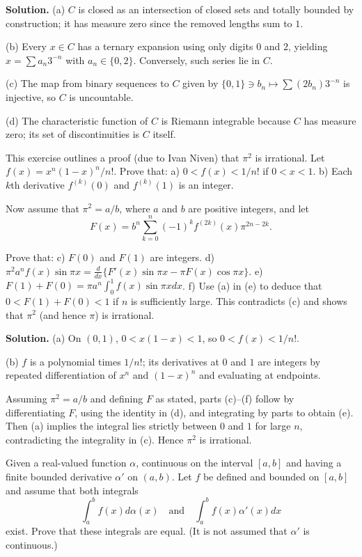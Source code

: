 \noindent\textbf{Solution.}
(a) $C$ is closed as an intersection of closed sets and totally bounded by construction; it has measure zero since the removed lengths sum to $1$.

(b) Every $x\in C$ has a ternary expansion using only digits $0$ and $2$, yielding $x=\sum a_n 3^{-n}$ with $a_n\in\{0,2\}$. Conversely, such series lie in $C$.

(c) The map from binary sequences to $C$ given by $\{0,1\}\ni b_n\mapsto \sum (2b_n)3^{-n}$ is injective, so $C$ is uncountable.

(d) The characteristic function of $C$ is Riemann integrable because $C$ has measure zero; its set of discontinuities is $C$ itself.
\medskip

\begin{problembox}[7.33: Irrationality of $\pi^2$]
This exercise outlines a proof (due to Ivan Niven) that $\pi^2$ is irrational. Let $f(x) = x^n(1 - x)^n/n!$. Prove that:
a) $0 < f(x) < 1/n!$ if $0 < x < 1$.
b) Each $k$th derivative $f^{(k)}(0)$ and $f^{(k)}(1)$ is an integer.

Now assume that $\pi^2 = a/b$, where $a$ and $b$ are positive integers, and let
\[F(x) = b^n \sum_{k=0}^{n} (-1)^k f^{(2k)}(x) \pi^{2n-2k}.\]

Prove that:
c) $F(0)$ and $F(1)$ are integers.
d) $\pi^2 a^n f(x) \sin \pi x = \frac{d}{dx} \{ F'(x) \sin \pi x - \pi F(x) \cos \pi x \}$.
e) $F(1) + F(0) = \pi a^n \int_{0}^{1} f(x) \sin \pi x dx$.
f) Use (a) in (e) to deduce that $0 < F(1) + F(0) < 1$ if $n$ is sufficiently large. This contradicts (c) and shows that $\pi^2$ (and hence $\pi$) is irrational.
\end{problembox}

\noindent\textbf{Solution.}
(a) On $(0,1)$, $0<x(1-x)<1$, so $0<f(x)<1/n!$.

(b) $f$ is a polynomial times $1/n!$; its derivatives at $0$ and $1$ are integers by repeated differentiation of $x^n$ and $(1-x)^n$ and evaluating at endpoints.

Assuming $\pi^2=a/b$ and defining $F$ as stated, parts (c)–(f) follow by differentiating $F$, using the identity in (d), and integrating by parts to obtain (e). Then (a) implies the integral lies strictly between $0$ and $1$ for large $n$, contradicting the integrality in (c). Hence $\pi^2$ is irrational.
\medskip

\begin{problembox}
Given a real-valued function $\alpha$, continuous on the interval $[a, b]$ and having a finite bounded derivative $\alpha'$ on $(a, b)$. Let $f$ be defined and bounded on $[a, b]$ and assume that both integrals
\[\int_{a}^{b} f(x) d\alpha(x) \quad \text{and} \quad \int_{a}^{b} f(x) \alpha'(x) dx\]
exist. Prove that these integrals are equal. (It is not assumed that $\alpha'$ is continuous.)
\end{problembox}

